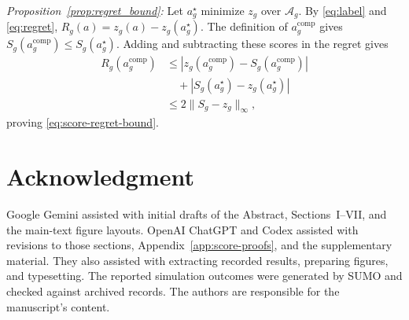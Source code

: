 \documentclass[letterpaper,journal]{IEEEtran}
\begin{document}
\emph{Proposition~\ref{prop:regret_bound}:} Let $a_g^\star$ minimize $z_g$ over $\mathcal A_g$. By \eqref{eq:label} and \eqref{eq:regret}, $R_g(a)=z_g(a)-z_g(a_g^\star)$. The definition of $a_g^{\mathrm{comp}}$ gives $S_g(a_g^{\mathrm{comp}})\leq S_g(a_g^\star)$. Adding and subtracting these scores in the regret gives
\begin{align*}
 R_g(a_g^{\mathrm{comp}})
 &\leq |z_g(a_g^{\mathrm{comp}})-S_g(a_g^{\mathrm{comp}})|\\
 &\quad+|S_g(a_g^\star)-z_g(a_g^\star)|\\
 &\leq2\|S_g-z_g\|_\infty,
\end{align*}
proving \eqref{eq:score-regret-bound}.

\section*{Acknowledgment}
Google Gemini assisted with initial drafts of the Abstract, Sections~I--VII, and the main-text figure layouts. OpenAI ChatGPT and Codex assisted with revisions to those sections, Appendix~\ref{app:score-proofs}, and the supplementary material. They also assisted with extracting recorded results, preparing figures, and typesetting. The reported simulation outcomes were generated by SUMO and checked against archived records. The authors are responsible for the manuscript's content.
\end{document}
